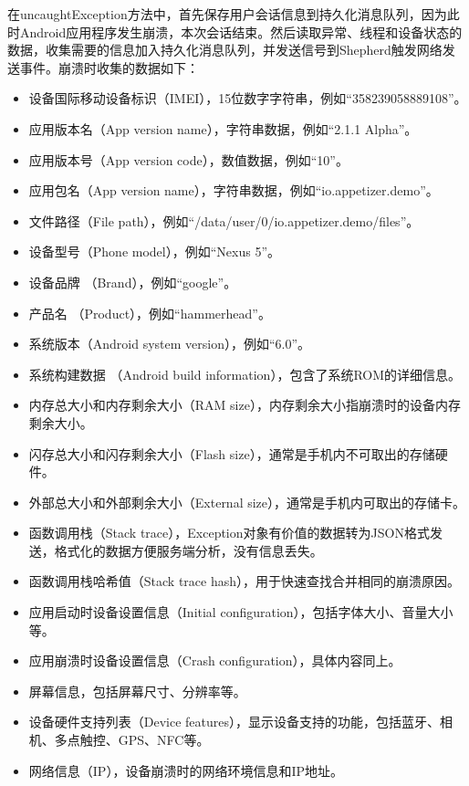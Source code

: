 在uncaughtException方法中，首先保存用户会话信息到持久化消息队列，因为此时Android应用程序发生崩溃，本次会话结束。然后读取异常、线程和设备状态的数据，收集需要的信息加入持久化消息队列，并发送信号到Shepherd触发网络发送事件。崩溃时收集的数据如下：

 \begin{itemize}
 	\item 设备国际移动设备标识（IMEI），15位数字字符串，例如“358239058889108”。
 	\item 应用版本名（App version name），字符串数据，例如“2.1.1 Alpha”。
 	\item 应用版本号（App version code），数值数据，例如“10”。
 	\item 应用包名（App version name），字符串数据，例如“io.appetizer.demo”。
 	\item 文件路径（File path），例如“/data/user/0/io.appetizer.demo/files”。
 	\item 设备型号（Phone model），例如“Nexus 5”。
 	\item 设备品牌 （Brand），例如“google”。
 	\item 产品名 （Product），例如“hammerhead”。
 	\item 系统版本（Android system version），例如“6.0”。
 	\item 系统构建数据 （Android build information），包含了系统ROM的详细信息。
 	\item 内存总大小和内存剩余大小（RAM size），内存剩余大小指崩溃时的设备内存剩余大小。
 	\item 闪存总大小和闪存剩余大小（Flash size），通常是手机内不可取出的存储硬件。
 	\item 外部总大小和外部剩余大小（External size），通常是手机内可取出的存储卡。
 	\item 函数调用栈（Stack trace），Exception对象有价值的数据转为JSON格式发送，格式化的数据方便服务端分析，没有信息丢失。
 	\item 函数调用栈哈希值（Stack trace hash），用于快速查找合并相同的崩溃原因。
 	\item 应用启动时设备设置信息（Initial configuration），包括字体大小、音量大小等。
 	\item 应用崩溃时设备设置信息（Crash configuration），具体内容同上。
 	\item 屏幕信息，包括屏幕尺寸、分辨率等。
 	\item 设备硬件支持列表（Device features），显示设备支持的功能，包括蓝牙、相机、多点触控、GPS、NFC等。
 	\item 网络信息（IP），设备崩溃时的网络环境信息和IP地址。
 \end{itemize}
 
